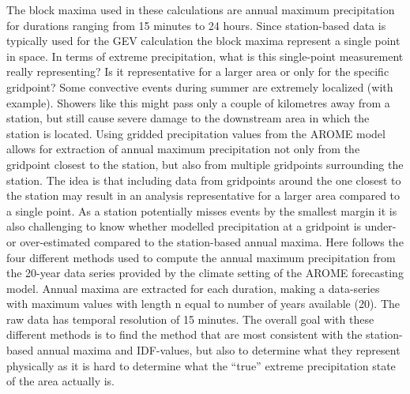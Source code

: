 The block maxima used in these calculations are annual maximum precipitation for durations ranging from 15 minutes to 24 hours. Since station-based data is typically used for the GEV calculation the block maxima represent a single point in space. In terms of extreme precipitation, what is this single-point measurement really representing? Is it representative for a larger area or only for the specific gridpoint? Some convective events during summer are extremely localized (with example). Showers like this might pass only a couple of kilometres away from a station, but still cause severe damage to the downstream area in which the station is located. Using gridded precipitation values from the AROME model allows for extraction of annual maximum precipitation not only from the gridpoint closest to the station, but also from multiple gridpoints surrounding the station. The idea is that including data from gridpoints around the one closest to the station may result in an analysis representative for a larger area compared to a single point. As a station potentially misses events by the smallest margin it is also challenging to know whether modelled precipitation at a gridpoint is under- or over-estimated compared to the station-based annual maxima. Here follows the four different methods used to compute the annual maximum precipitation from the 20-year data series provided by the climate setting of the AROME forecasting model. Annual maxima are extracted for each duration, making a data-series with maximum values with length n equal to number of years available (20). The raw data has temporal resolution of 15 minutes. The overall goal with these different methods is to find the method that are most consistent with the station-based annual maxima and IDF-values, but also to determine what they represent physically as it is hard to determine what the “true” extreme precipitation state of the area actually is.  

